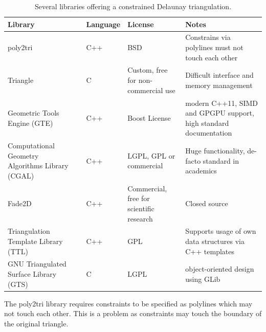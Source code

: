 \renewcommand{\arraystretch}{1.5} %
\begin{table}[h]
	\centering
	\begin{tabular}{p{3cm} l l p{2.1cm} p{3.9cm}}
		Library                                          &                           & Language & License                                  & Notes                                                             \\
		\midrule
		poly2tri                                         & \cite{poly2tri}           & C++      & BSD                                      & Constrains via polylines must not touch each other                \\
		Triangle                                         & \cite{triangle_lib}       & C        & Custom, free for non-commercial use      & Difficult interface and memory management                         \\
		Geometric Tools Engine (GTE)                     & \cite{gte}                & C++      & Boost License                            & modern C++11, SIMD and GPGPU support, high standard documentation \\
		Computational Geometry Algorithms Library (CGAL) & \cite{cgal_triangulation} & C++      & LGPL, GPL or commercial                  & Huge functionality, de-facto standard in academics                \\
		Fade2D                                           & \cite{fade2d}             & C++      & Commercial, free for scientific research & Closed source                                                     \\
		Triangulation Template Library (TTL)             & \cite{ttl}                & C++      & GPL                                      & Supports usage of own data structures via C++ templates           \\
		GNU Triangulated Surface Library (GTS)           & \cite{gts}                & C        & LGPL                                     & object-oriented design using GLib                                 \\
	\end{tabular}
	\caption[CDT libraries]{
		Several libraries offering a constrained Delaunay triangulation.
	}
	\label{tbl:delaunay_libs}
\end{table}
\renewcommand{\arraystretch}{1.0}

The poly2tri library requires constraints to be specified as polylines which may not touch each other.
This is a problem as constraints may touch the boundary of the original triangle.

